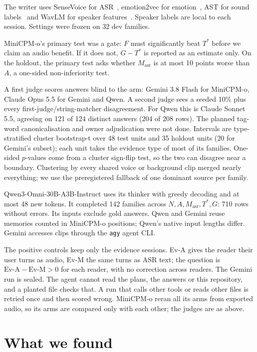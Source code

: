 \documentclass[11pt]{article}
\begin{document}
The writer uses SenseVoice for ASR~\cite{sensevoice}, emotion2vec for emotion~\cite{emotion2vec},
AST for sound labels~\cite{ast} and WavLM for speaker features~\cite{wavlm}. Speaker labels are local to
each session.
Settings were frozen on 32 dev families.

MiniCPM-o's primary test was a gate: $F$ must significantly beat $T^*$ before we claim an audio benefit. If it does
not, $G - T^*$ is reported as an estimate only. On the holdout, the primary test asks whether
$M_{\mathrm{asr}}$ is at most 10 points worse than $A$, a one-sided non-inferiority test.

A first judge scores answers blind to the arm: Gemini 3.8 Flash for MiniCPM-o, Claude Opus 5.5 for
Gemini and Qwen. A second judge sees a seeded 10\% plus every first-judge/string-matcher disagreement.
For Qwen this is Claude Sonnet 5.5, agreeing on 121 of 124 distinct answers (204 of 208 rows).
The planned tag-word canonicalisation and owner adjudication were not done.
Intervals are type-stratified cluster bootstrap-t over 48 test units and 35 holdout units (20 for Gemini's
subset); each unit takes the evidence type of most of its families. One-sided $p$-values come from a
cluster sign-flip test, so the two can disagree near a boundary.
Clustering by every shared voice or background clip merged nearly everything;
we use the preregistered fallback of one dominant source per family.

Qwen3-Omni-30B-A3B-Instruct uses its thinker with greedy decoding and at most 48 new tokens.
It completed 142 families across $N,A,M_{\mathrm{asr}},T^*,G$: 710 rows without errors.
Its inputs exclude gold answers. Qwen and Gemini reuse memories counted in MiniCPM-o positions;
Qwen's native input lengths differ. Gemini accesses clips through the \texttt{agy} agent CLI.

The positive controls keep only the evidence sessions. Ev-A gives the reader their user turns as audio,
Ev-M the same turns as ASR text; the question is $\text{Ev-A} - \text{Ev-M} > 0$ for each reader, with no
correction across readers. The Gemini run is sealed. The agent cannot read the plans, the answers or this
repository, and a planted file checks that. A run that calls other tools or reads other files is retried
once and then scored wrong. MiniCPM-o reran all its arms from exported audio, so its arms are compared only
with each other; the judges are as above.

\section{What we found}
\end{document}
